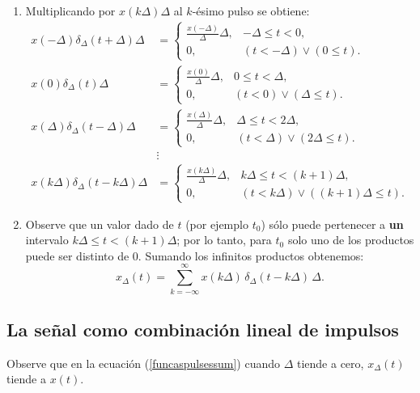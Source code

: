 \documentclass[11pt,a4paper,openany]{book}
\begin{document}
\begin{enumerate}
	\item Multiplicando por $x(k\Delta)\Delta$ al $k$-ésimo pulso se obtiene:
	\begin{align}
		x(-\Delta)\delta_{\Delta}(t+\Delta)\Delta &=
		\begin{cases}
			\frac{x(-\Delta)}{\Delta}\Delta, & -\Delta \leq t < 0, \\ 
			0, & (t < -\Delta) \lor (0 \leq t).
		\end{cases} \\
		x(0)\delta_{\Delta}(t)\Delta &=
		\begin{cases}
			\frac{x(0)}{\Delta}\Delta, & 0 \leq t < \Delta, \\ 
			0, & (t < 0) \lor (\Delta \leq t).
		\end{cases} \\
		x(\Delta)\delta_{\Delta}(t-\Delta)\Delta &=
		\begin{cases}
			\frac{x(\Delta)}{\Delta}\Delta, & \Delta \leq t < 2\Delta, \\ 
			0, & (t < \Delta) \lor (2\Delta \leq t).
		\end{cases} \\
		&\vdots \nonumber \\
		x(k\Delta)\delta_{\Delta}(t-k\Delta)\Delta &=
		\begin{cases}
			\frac{x(k\Delta)}{\Delta}\Delta, & k\Delta \leq t < (k+1)\Delta, \\ 
			0, & (t < k\Delta) \lor ((k+1)\Delta \leq t).
		\end{cases}
	\end{align}
	
	\item Observe que un valor dado de $t$ (por ejemplo $t_{0}$) sólo puede pertenecer a \textbf{un} intervalo 
	$k\Delta \leq t < (k+1)\Delta$; por lo tanto, para $t_{0}$ solo uno de los productos puede ser distinto de $0$.
	Sumando los infinitos productos obtenemos:
	\begin{equation}
		x_{\Delta}(t) = \sum_{k=-\infty}^{\infty} x(k\Delta) \, \delta_{\Delta}(t-k\Delta) \, \Delta .
		\label{funcaspulsessum}
	\end{equation}
\end{enumerate}

\subsection{La señal como combinación lineal de impulsos}

Observe que en la ecuación (\ref{funcaspulsessum}) cuando 
$\Delta$ tiende a cero, $x_{\Delta}(t)$ tiende a $x(t)$.
\end{document}
